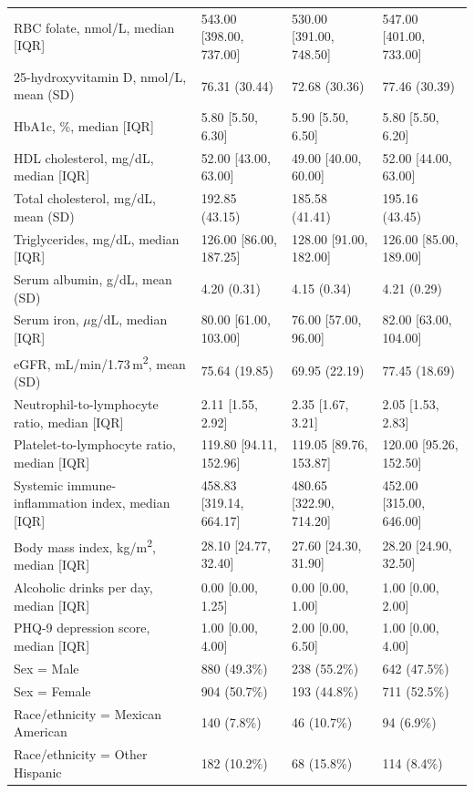 \documentclass[12pt]{article}
\begin{document}
\begin{longtable}{p{6.6cm}R{2.6cm}R{2.6cm}R{2.6cm}}
RBC folate, nmol/L, median [IQR] & 543.00 [398.00, 737.00] & 530.00 [391.00, 748.50] & 547.00 [401.00, 733.00] \\
25-hydroxyvitamin D, nmol/L, mean (SD) & 76.31 (30.44) & 72.68 (30.36) & 77.46 (30.39) \\
HbA1c, \%, median [IQR] & 5.80 [5.50, 6.30] & 5.90 [5.50, 6.50] & 5.80 [5.50, 6.20] \\
HDL cholesterol, mg/dL, median [IQR] & 52.00 [43.00, 63.00] & 49.00 [40.00, 60.00] & 52.00 [44.00, 63.00] \\
Total cholesterol, mg/dL, mean (SD) & 192.85 (43.15) & 185.58 (41.41) & 195.16 (43.45) \\
Triglycerides, mg/dL, median [IQR] & 126.00 [86.00, 187.25] & 128.00 [91.00, 182.00] & 126.00 [85.00, 189.00] \\
Serum albumin, g/dL, mean (SD) & 4.20 (0.31) & 4.15 (0.34) & 4.21 (0.29) \\
Serum iron, $\mu$g/dL, median [IQR] & 80.00 [61.00, 103.00] & 76.00 [57.00, 96.00] & 82.00 [63.00, 104.00] \\
eGFR, mL/min/1.73\,m\textsuperscript{2}, mean (SD) & 75.64 (19.85) & 69.95 (22.19) & 77.45 (18.69) \\
Neutrophil-to-lymphocyte ratio, median [IQR] & 2.11 [1.55, 2.92] & 2.35 [1.67, 3.21] & 2.05 [1.53, 2.83] \\
Platelet-to-lymphocyte ratio, median [IQR] & 119.80 [94.11, 152.96] & 119.05 [89.76, 153.87] & 120.00 [95.26, 152.50] \\
Systemic immune-inflammation index, median [IQR] & 458.83 [319.14, 664.17] & 480.65 [322.90, 714.20] & 452.00 [315.00, 646.00] \\
Body mass index, kg/m\textsuperscript{2}, median [IQR] & 28.10 [24.77, 32.40] & 27.60 [24.30, 31.90] & 28.20 [24.90, 32.50] \\
Alcoholic drinks per day, median [IQR] & 0.00 [0.00, 1.25] & 0.00 [0.00, 1.00] & 1.00 [0.00, 2.00] \\
PHQ-9 depression score, median [IQR] & 1.00 [0.00, 4.00] & 2.00 [0.00, 6.50] & 1.00 [0.00, 4.00] \\
Sex = Male & 880 (49.3\%) & 238 (55.2\%) & 642 (47.5\%) \\
Sex = Female & 904 (50.7\%) & 193 (44.8\%) & 711 (52.5\%) \\
Race/ethnicity = Mexican American & 140 (7.8\%) & 46 (10.7\%) & 94 (6.9\%) \\
Race/ethnicity = Other Hispanic & 182 (10.2\%) & 68 (15.8\%) & 114 (8.4\%) \\

\end{longtable}
\end{document}

